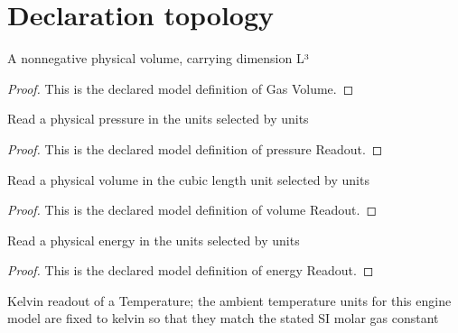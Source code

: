 \section{Declaration topology}
\begin{definition}
  \label{def:physics:phyx-mini-0349:phyxminiproblems-problemphyxmini0349-gasvolume}
  A nonnegative physical volume, carrying dimension L³
\end{definition}
\begin{proof}
  This is the declared model definition of Gas Volume.
\end{proof}
\begin{definition}
  \label{def:physics:phyx-mini-0349:phyxminiproblems-problemphyxmini0349-pressurereadout}
  Read a physical pressure in the units selected by units
\end{definition}
\begin{proof}
  This is the declared model definition of pressure Readout.
\end{proof}
\begin{definition}
  \label{def:physics:phyx-mini-0349:phyxminiproblems-problemphyxmini0349-volumereadout}
  Read a physical volume in the cubic length unit selected by units
\end{definition}
\begin{proof}
  This is the declared model definition of volume Readout.
\end{proof}
\begin{definition}
  \label{def:physics:phyx-mini-0349:phyxminiproblems-problemphyxmini0349-energyreadout}
  Read a physical energy in the units selected by units
\end{definition}
\begin{proof}
  This is the declared model definition of energy Readout.
\end{proof}
\begin{definition}
  \label{def:physics:phyx-mini-0349:phyxminiproblems-problemphyxmini0349-temperatureinkelvins}
  Kelvin readout of a Temperature; the ambient temperature units for this engine model are fixed to kelvin so that they match the stated SI molar gas constant
\end{definition}
